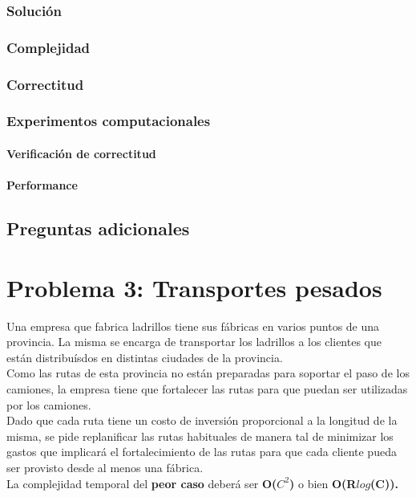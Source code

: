 \documentclass[a4paper, 10pt, twoside]{article}
\begin{document}
\subsubsection{Solución}

\subsubsection{Complejidad}

\subsubsection{Correctitud}

\subsubsection{Experimentos computacionales}

\paragraph{Verificación de correctitud}

\paragraph{Performance}

\subsection{Preguntas adicionales}





\newpage

\section{Problema 3: Transportes pesados}

Una empresa que fabrica ladrillos tiene sus fábricas en varios puntos de una provincia. La misma se encarga de transportar los ladrillos a los clientes que están distribuísdos en distintas ciudades de la provincia.\\
Como las rutas de esta provincia no están preparadas para soportar el paso de los camiones, la empresa tiene que fortalecer las rutas para que puedan ser utilizadas por los camiones.\\
Dado que cada ruta tiene un costo de inversión proporcional a la longitud de la misma, se pide replanificar las rutas habituales de manera tal de minimizar los gastos que implicará el fortalecimiento de las rutas para que cada cliente pueda ser provisto desde al menos una fábrica.\\
La complejidad temporal del \textbf{peor caso} deberá ser \textbf{O($C^2$)} o bien \textbf{O(R$log$(C)).}
\end{document}

